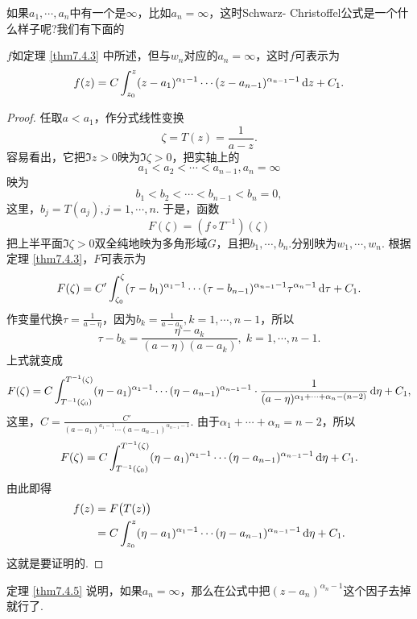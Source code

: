 如果$a_1,\cdots,a_n$中有一个是$\infty$，比如$a_n=\infty$，这时Schwarz-
Christoffel公式是一个什么样子呢?我们有下面的
\begin{theorem}\label{thm7.4.5}
  $f$如定理 \ref{thm7.4.3} 中所述，但与$w_n$对应的$a_n=\infty$，这时$f$可表示为
  \begin{equation}\label{eq7.4.8}
    f(z) = C\int_{z_0}^z(z-a_1)^{\alpha_1-1}\cdots(z-a_{n-1})^{\alpha_{n-1}-1}\mathop{}\!\mathrm dz + C_1.
  \end{equation}
\end{theorem}
\begin{proof}
  任取$a<a_1$，作分式线性变换
  \[
    \zeta = T(z) = \frac1{a-z}.
  \]
  容易看出，它把$\Im z>0$映为$\Im\zeta>0$，把实轴上的
  \[
    a_1 < a_2 < \cdots < a_{n-1}, a_n = \infty
  \]
  映为
  \[
    b_1 < b_2 < \cdots < b_{n-1} < b_n = 0 ,
  \]
  这里，$b_j=T(a_j),j=1,\cdots,n$. 于是，函数
  \[
    F(\zeta) = (f\circ T^{-1})(\zeta)
  \]
  把上半平面$\Im\zeta>0$双全纯地映为多角形域$G$，且把$b_1,\cdots,b_n$.分别映为$w_1,\cdots,w_n$. 根据定理 \ref{thm7.4.3}，$F$可表示为
  \[
    F(\zeta) = C'\int_{\zeta_0}^\zeta(\tau-b_1)^{\alpha_1-1}\cdots
    (\tau-b_{n-1})^{\alpha_{n-1}-1}\tau^{\alpha_n-1}\mathop{}\!\mathrm{d} \tau+C_1.
  \]
  作变量代换$\tau=\frac1{a-\eta}$，因为$b_k=\frac1{a-a_k},k=1,\cdots,n-1$，所以
  \[
    \tau - b_k = \frac{\eta-a_k}{(a-\eta)(a-a_k)},\; k=1,\cdots,n-1.
  \]
  上式就变成
  \[
    F(\zeta) = C\int_{T^{-1}(\zeta_0)}^{T^{-1}(\zeta)}(\eta-a_1)^{\alpha_1-1}\cdots(\eta-a_{n-1})
    ^{\alpha_{n-1}-1}\cdot\frac1{(a-\eta)^{\alpha_1+\cdots+\alpha_n-(n-2)}}\mathop{}\!\mathrm{d} \eta+C_1,
  \]
  这里，$C=\frac{C'}{(a-a_1)^{a_1-1}\cdots(a-a_{n-1})^{\alpha_{n-1}-1}}$. 由于$\alpha_1+\cdots+\alpha_n=n-2$，所以
  \[
    F(\zeta) = C\int_{T^{-1}(\zeta_0)}^{T^{-1}(\zeta)}(\eta-a_1)^{\alpha_1-1}\cdots(\eta-a_{n-1})
    ^{\alpha_{n-1}-1}\mathop{}\!\mathrm{d} \eta+C_1.
  \]
  由此即得
  \begin{align*}
    f(z) & = F\big( T(z) \big)\\
    & = C\int_{z_0}^z(\eta-a_1)^{\alpha_1-1}\cdots(\eta-a_{n-1})^{\alpha_{n-1}-1}\mathop{}\!\mathrm{d} \eta+C_1.
  \end{align*}
  这就是要证明的.
\end{proof}

定理 \ref{thm7.4.5} 说明，如果$a_n=\infty$，那么在公式中把$(z-a_n)^{\alpha_n-1}$这个因子去掉就行了.

